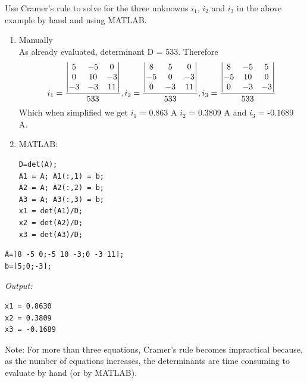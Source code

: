 \documentclass[book.tex]{subfiles}
\begin{document}
\begin{example}
Use Cramer's rule to solve for the three unknowns  $i_1$, $i_2$ and $i_3$ in the above example by hand and using MATLAB.\\
\vspace{-20pt}
\begin{enumerate}
\item Manually\\
As already evaluated, determinant D = 533. Therefore
\[
i_1 =\dfrac{
	\begin{vmatrix}
	5 & -5 & 0 \\ 
	0 & 10 & -3 \\ 
	-3 & -3 & 11
	\end{vmatrix}
}{533}, i_2 =\dfrac{
	\begin{vmatrix}
	8 & 5 & 0 \\ 
	-5 & 0 & -3 \\ 
	0 & -3 & 11
	\end{vmatrix}
}{533}, i_3 =\dfrac{
	\begin{vmatrix}
	8 & -5 & 5 \\ 
	-5 & 10 & 0 \\ 
	0 & -3 & -3
	\end{vmatrix}
}{533} 
\vspace{-6pt}
\]
Which when simplified we get $i_1$ = 0.863 A $i_2$ = 0.3809 A and $i_3$ = -0.1689 A.
\item MATLAB:
\begin{Verbatim}
D=det(A);
A1 = A; A1(:,1) = b;
A2 = A; A2(:,2) = b;
A3 = A; A3(:,3) = b;
x1 = det(A1)/D;
x2 = det(A2)/D;
x3 = det(A3)/D;
\end{Verbatim}
\end{enumerate}
\begin{marginfigure}[-20\baselineskip]
	\begin{Verbatim}
A=[8 -5 0;-5 10 -3;0 -3 11];
b=[5;0;-3];
	\end{Verbatim}
\end{marginfigure}
\begin{marginfigure}[-10\baselineskip]
\textit{Output:}
\begin{Verbatim}
x1 = 0.8630
x2 = 0.3809
x3 = -0.1689
\end{Verbatim}
\end{marginfigure}
Note: For more than three equations, Cramer's rule becomes impractical because, as the number of equations increases, the determinants are time consuming to evaluate by hand (or by MATLAB).
\end{example}
\end{document}
